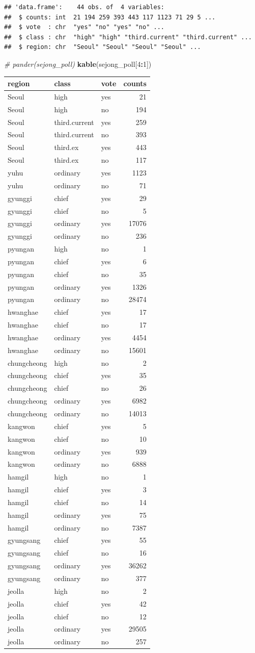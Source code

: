 \documentclass[
]{article}
\newenvironment{Shaded}{\begin{snugshade}}{\end{snugshade}}
\newcommand{\CommentTok}[1]{\textcolor[rgb]{0.56,0.35,0.01}{\textit{#1}}}
\newcommand{\DecValTok}[1]{\textcolor[rgb]{0.00,0.00,0.81}{#1}}
\newcommand{\KeywordTok}[1]{\textcolor[rgb]{0.13,0.29,0.53}{\textbf{#1}}}
\newcommand{\NormalTok}[1]{#1}
\newcommand{\OperatorTok}[1]{\textcolor[rgb]{0.81,0.36,0.00}{\textbf{#1}}}
\begin{document}
\begin{verbatim}
## 'data.frame':    44 obs. of  4 variables:
##  $ counts: int  21 194 259 393 443 117 1123 71 29 5 ...
##  $ vote  : chr  "yes" "no" "yes" "no" ...
##  $ class : chr  "high" "high" "third.current" "third.current" ...
##  $ region: chr  "Seoul" "Seoul" "Seoul" "Seoul" ...
\end{verbatim}

\begin{Shaded}
\begin{Highlighting}[]
\CommentTok{\# pander(sejong\_poll)}
\KeywordTok{kable}\NormalTok{(sejong\_poll[}\DecValTok{4}\OperatorTok{:}\DecValTok{1}\NormalTok{])}
\end{Highlighting}
\end{Shaded}

\begin{longtable}[]{@{}lllr@{}}
\toprule
region & class & vote & counts\tabularnewline
\midrule
\endhead
Seoul & high & yes & 21\tabularnewline
Seoul & high & no & 194\tabularnewline
Seoul & third.current & yes & 259\tabularnewline
Seoul & third.current & no & 393\tabularnewline
Seoul & third.ex & yes & 443\tabularnewline
Seoul & third.ex & no & 117\tabularnewline
yuhu & ordinary & yes & 1123\tabularnewline
yuhu & ordinary & no & 71\tabularnewline
gyunggi & chief & yes & 29\tabularnewline
gyunggi & chief & no & 5\tabularnewline
gyunggi & ordinary & yes & 17076\tabularnewline
gyunggi & ordinary & no & 236\tabularnewline
pyungan & high & no & 1\tabularnewline
pyungan & chief & yes & 6\tabularnewline
pyungan & chief & no & 35\tabularnewline
pyungan & ordinary & yes & 1326\tabularnewline
pyungan & ordinary & no & 28474\tabularnewline
hwanghae & chief & yes & 17\tabularnewline
hwanghae & chief & no & 17\tabularnewline
hwanghae & ordinary & yes & 4454\tabularnewline
hwanghae & ordinary & no & 15601\tabularnewline
chungcheong & high & no & 2\tabularnewline
chungcheong & chief & yes & 35\tabularnewline
chungcheong & chief & no & 26\tabularnewline
chungcheong & ordinary & yes & 6982\tabularnewline
chungcheong & ordinary & no & 14013\tabularnewline
kangwon & chief & yes & 5\tabularnewline
kangwon & chief & no & 10\tabularnewline
kangwon & ordinary & yes & 939\tabularnewline
kangwon & ordinary & no & 6888\tabularnewline
hamgil & high & no & 1\tabularnewline
hamgil & chief & yes & 3\tabularnewline
hamgil & chief & no & 14\tabularnewline
hamgil & ordinary & yes & 75\tabularnewline
hamgil & ordinary & no & 7387\tabularnewline
gyungsang & chief & yes & 55\tabularnewline
gyungsang & chief & no & 16\tabularnewline
gyungsang & ordinary & yes & 36262\tabularnewline
gyungsang & ordinary & no & 377\tabularnewline
jeolla & high & no & 2\tabularnewline
jeolla & chief & yes & 42\tabularnewline
jeolla & chief & no & 12\tabularnewline
jeolla & ordinary & yes & 29505\tabularnewline
jeolla & ordinary & no & 257\tabularnewline
\bottomrule
\end{longtable}
\end{document}
